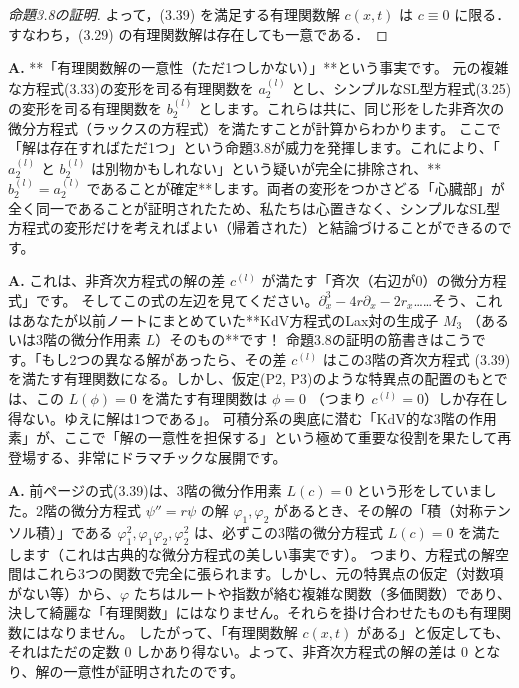 \begin{story}
\begin{proof}[命題3.8の証明]
よって，(3.39) を満足する有理関数解 $c(x,t)$ は $c \equiv 0$ に限る．すなわち，(3.29) の有理関数解は存在しても一意である．
\end{proof}
\end{story}

\begin{Q}
\textbf{A.} **「有理関数解の一意性（ただ1つしかない）」**という事実です。
元の複雑な方程式(3.33)の変形を司る有理関数を $a_2^{(l)}$ とし、シンプルなSL型方程式(3.25)の変形を司る有理関数を $b_2^{(l)}$ とします。これらは共に、同じ形をした非斉次の微分方程式（ラックスの方程式）を満たすことが計算からわかります。
ここで「解は存在すればただ1つ」という命題3.8が威力を発揮します。これにより、「$a_2^{(l)}$ と $b_2^{(l)}$ は別物かもしれない」という疑いが完全に排除され、**$b_2^{(l)} = a_2^{(l)}$ であることが確定**します。両者の変形をつかさどる「心臓部」が全く同一であることが証明されたため、私たちは心置きなく、シンプルなSL型方程式の変形だけを考えればよい（帰着された）と結論づけることができるのです。
\end{Q}

\begin{Q}
\textbf{A.} これは、非斉次方程式の解の差 $c^{(l)}$ が満たす「斉次（右辺が0）の微分方程式」です。
そしてこの式の左辺を見てください。$\partial_x^3 - 4r\partial_x - 2r_x$……そう、これはあなたが以前ノートにまとめていた**KdV方程式のLax対の生成子 $M_3$ （あるいは3階の微分作用素 $L$）そのもの**です！
命題3.8の証明の筋書きはこうです。「もし2つの異なる解があったら、その差 $c^{(l)}$ はこの3階の斉次方程式 (3.39) を満たす有理関数になる。しかし、仮定(P2, P3)のような特異点の配置のもとでは、この $L(\phi)=0$ を満たす有理関数は $\phi=0$ （つまり $c^{(l)}=0$）しか存在し得ない。ゆえに解は1つである」。
可積分系の奥底に潜む「KdV的な3階の作用素」が、ここで「解の一意性を担保する」という極めて重要な役割を果たして再登場する、非常にドラマチックな展開です。
\end{Q}

\begin{Q}[【核心】前半の証明のフィニッシュはどういう論理なのか？]
\textbf{A.} 前ページの式(3.39)は、3階の微分作用素 $L(c) = 0$ という形をしていました。2階の微分方程式 $\psi'' = r\psi$ の解 $\varphi_1, \varphi_2$ があるとき、その解の「積（対称テンソル積）」である $\varphi_1^2, \varphi_1\varphi_2, \varphi_2^2$ は、必ずこの3階の微分方程式 $L(c)=0$ を満たします（これは古典的な微分方程式の美しい事実です）。
つまり、方程式の解空間はこれら3つの関数で完全に張られます。しかし、元の特異点の仮定（対数項がない等）から、$\varphi$ たちはルートや指数が絡む複雑な関数（多価関数）であり、決して綺麗な「有理関数」にはなりません。それらを掛け合わせたものも有理関数にはなりません。
したがって、「有理関数解 $c(x,t)$ がある」と仮定しても、それはただの定数 $0$ しかあり得ない。よって、非斉次方程式の解の差は $0$ となり、解の一意性が証明されたのです。
\end{Q}

